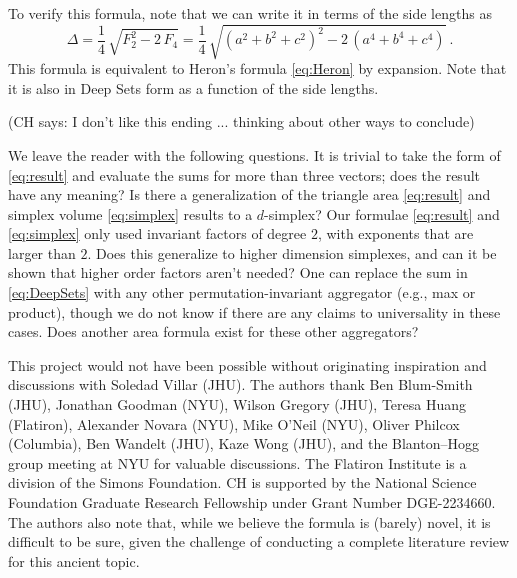 \documentclass[10pt]{article}
\newcommand{\CH}[1]{{\color{blue} (CH says: #1)}}
\newcommand{\Hogg}[1]{{\color{violet} (Hogg says: #1)}}
\begin{document}
To verify this formula, note that we can write it in terms of the side lengths as
\begin{equation}
\label{eq:HeronDeepSets}
    \Delta = \frac{1}{4} \, \sqrt{
        F_2^2
        - 2 \, F_4
    }
    = \frac{1}{4} \, \sqrt{
        \left( a^2 + b^2 + c^2 \right)^2
        - 2 \, \left( a^4 + b^4 + c^4 \right)
    }~.
\end{equation}
This formula is equivalent to Heron's formula \eqref{eq:Heron} by expansion.
Note that it is also in Deep Sets form as a function of the side lengths.

\CH{I don't like this ending ... thinking about other ways to conclude}

We leave the reader with the following questions. 
It is trivial to take the form of \eqref{eq:result} and evaluate the sums for more than three vectors; does the result have any meaning?
Is there a generalization of the triangle area \eqref{eq:result} and simplex volume \eqref{eq:simplex} results to a $d$-simplex?
Our formulae \eqref{eq:result} and \eqref{eq:simplex} only used invariant factors of degree $2$, with exponents that are larger than $2$. Does this generalize to higher dimension simplexes, and can it be shown that higher order factors aren't needed?
One can replace the sum in \eqref{eq:DeepSets} with any other permutation-invariant aggregator (e.g., max or product), though we do not know if there are any claims to universality in these cases. Does another area formula exist for these other aggregators?

{\footnotesize\par\bigskip\noindent
This project would not have been possible without originating inspiration and discussions with Soledad Villar (JHU).
The authors thank
  Ben Blum-Smith (JHU),
  Jonathan Goodman (NYU),
  Wilson Gregory (JHU),
  Teresa Huang (Flatiron),
  Alexander Novara (NYU),
  Mike O'Neil (NYU),
  Oliver Philcox (Columbia),
  Ben Wandelt (JHU),
  Kaze Wong (JHU),
and the Blanton--Hogg group meeting at NYU for valuable discussions.
The Flatiron Institute is a division of the Simons Foundation.
CH is supported by the National Science Foundation Graduate Research Fellowship under Grant Number DGE-2234660.
The authors also note that, while we believe the formula is (barely) novel, it is difficult to be sure, given the challenge of conducting a complete literature review for this ancient topic.\par}
\end{document}
